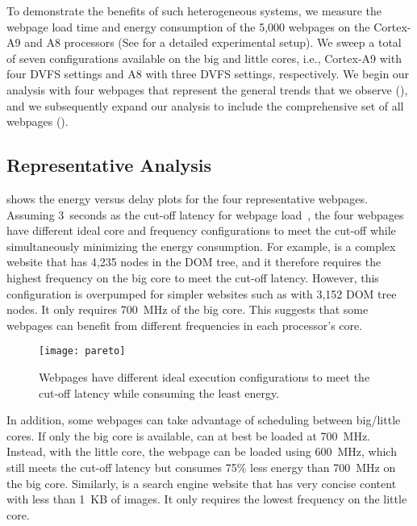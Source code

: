 To demonstrate the benefits of such heterogeneous systems, we measure the webpage load time and energy consumption of the 5,000 webpages on the Cortex-A9 and A8 processors (See  for a detailed experimental setup). We sweep a total of seven configurations available on the big and little cores, i.e., Cortex-A9 with four DVFS settings and A8 with three DVFS settings, respectively. We begin our analysis with four webpages that represent the general trends that we observe (), and we subsequently expand our analysis to include the comprehensive set of all webpages ().

\subsection{Representative Analysis}
\label{sec:runtime:char:representative}

 shows the energy versus delay plots for the four representative webpages. Assuming 3~seconds as the cut-off latency for webpage load~\cite{ThreeSecond}, the four webpages have different ideal core and frequency configurations to meet the cut-off while simultaneously minimizing the energy consumption. For example,  is a complex website that has 4,235 nodes in the DOM tree, and it therefore requires the highest frequency on the big core to meet the cut-off latency. However, this configuration is overpumped for simpler websites such as  with 3,152 DOM tree nodes. It only requires 700~MHz of the big core. This suggests that some webpages can benefit from different frequencies in each processor's core.

\begin{figure}[p]
\centering
\texttt{[image: pareto]}
\caption{Webpages have different ideal execution configurations to meet the cut-off latency while consuming the least energy.}
\label{fig:pareto}
\end{figure}

In addition, some webpages can take advantage of scheduling between big/little cores. If only the big core is available,  can at best be loaded at 700~MHz. Instead, with the little core, the webpage can be loaded using 600~MHz, which still meets the cut-off latency but consumes 75\% less energy than 700~MHz on the big core. Similarly,  is a search engine website that has very concise content with less than 1~KB of images. It only requires the lowest frequency on the little core.

